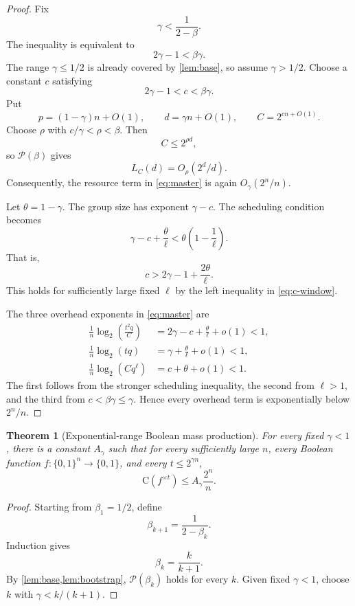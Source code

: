 \documentclass[11pt]{article}
\newtheorem{theorem}{Theorem}[section]
\theoremstyle{definition}
\newcommand{\bits}{\{0,1\}}
\newcommand{\C}{\mathrm{C}}
\begin{document}
\begin{proof}
Fix
\[
 \gamma<\frac1{2-\beta}.
\]
The inequality is equivalent to
\[
 2\gamma-1<\beta\gamma.
\]
The range $\gamma\le1/2$ is already covered by \cref{lem:base}, so assume $\gamma>1/2$.  Choose a constant $c$ satisfying
\begin{equation}\label{eq:c-window}
 2\gamma-1<c<\beta\gamma.
\end{equation}
Put
\[
 p=(1-\gamma)n+O(1),\qquad d=\gamma n+O(1),
 \qquad C=2^{cn+O(1)}.
\]
Choose $\rho$ with $c/\gamma<\rho<\beta$.  Then
\[
 C\le2^{\rho d},
\]
so $\mathcal P(\beta)$ gives
\[
 L_C(d)=O_\rho(2^d/d).
\]
Consequently, the resource term in \cref{eq:master} is again $O_\gamma(2^n/n)$.

Let $\theta=1-\gamma$.  The group size has exponent $\gamma-c$.  The scheduling condition becomes
\[
 \gamma-c+\frac{\theta}{\ell}
 <\theta\left(1-\frac1\ell\right).
\]
That is,
\[
 c>2\gamma-1+\frac{2\theta}{\ell}.
\]
This holds for sufficiently large fixed $\ell$ by the left inequality in \eqref{eq:c-window}.

The three overhead exponents in \cref{eq:master} are
\begin{align*}
 \frac1n\log_2\!\left(\frac{t^2q}{C}\right)
   &=2\gamma-c+\frac\theta\ell+o(1)<1,\\
 \frac1n\log_2(tq)
   &=\gamma+\frac\theta\ell+o(1)<1,\\
 \frac1n\log_2(Cq^\ell)
   &=c+\theta+o(1)<1.
\end{align*}
The first follows from the stronger scheduling inequality, the second from $\ell>1$, and the third from $c<\beta\gamma\le\gamma$.  Hence every overhead term is exponentially below $2^n/n$.
\end{proof}

\begin{theorem}[Exponential-range Boolean mass production]\label{thm:main-mass}
For every fixed $\gamma<1$, there is a constant $A_\gamma$ such that for every sufficiently large $n$, every Boolean function $f:\bits^n\to\bits$, and every
$t\le2^{\gamma n}$,
\[
 \C(f^{\times t})\le A_\gamma\frac{2^n}{n}.
\]
\end{theorem}

\begin{proof}
Starting from $\beta_1=1/2$, define
\[
 \beta_{k+1}=\frac1{2-\beta_k}.
\]
Induction gives
\[
 \beta_k=\frac{k}{k+1}.
\]
By \cref{lem:base,lem:bootstrap}, $\mathcal P(\beta_k)$ holds for every $k$.  Given fixed $\gamma<1$, choose $k$ with $\gamma<k/(k+1)$.
\end{proof}
\end{document}
